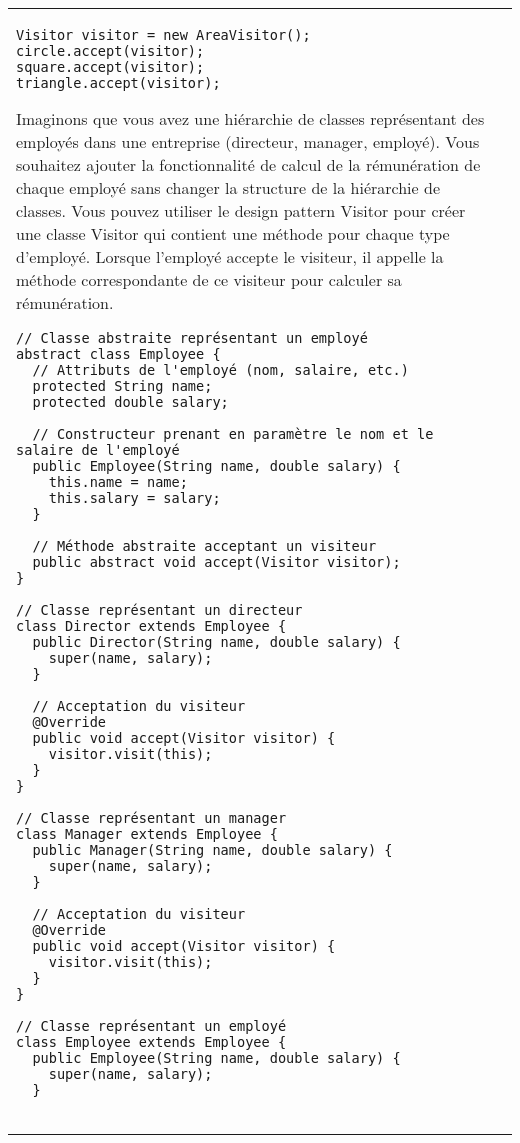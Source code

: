 \begin{minipage}[t]{1\textwidth}
\begin{table}[H]
\begin{adjustbox}{max width=\textwidth}
\begin{tabular}{l|p{\textwidth}}
\begin{minipage}[tl]{0.5\textwidth}
\begin{lstlisting}[style=monstyle]
Visitor visitor = new AreaVisitor();
circle.accept(visitor);
square.accept(visitor);
triangle.accept(visitor);
\end{lstlisting}
\end{minipage}
\hspace{6mm}
\begin{minipage}[tr]{0.5\textwidth}
Imaginons que vous avez une hiérarchie de classes représentant des employés dans une entreprise (directeur, manager, employé). Vous souhaitez ajouter la fonctionnalité de calcul de la rémunération de chaque employé sans changer la structure de la hiérarchie de classes. Vous pouvez utiliser le design pattern Visitor pour créer une classe Visitor qui contient une méthode pour chaque type d'employé. Lorsque l'employé accepte le visiteur, il appelle la méthode correspondante de ce visiteur pour calculer sa rémunération.  
\begin{lstlisting}[style=monstyle]
// Classe abstraite représentant un employé
abstract class Employee {
  // Attributs de l'employé (nom, salaire, etc.)
  protected String name;
  protected double salary;

  // Constructeur prenant en paramètre le nom et le salaire de l'employé
  public Employee(String name, double salary) {
    this.name = name;
    this.salary = salary;
  }

  // Méthode abstraite acceptant un visiteur
  public abstract void accept(Visitor visitor);
}

// Classe représentant un directeur
class Director extends Employee {
  public Director(String name, double salary) {
    super(name, salary);
  }

  // Acceptation du visiteur
  @Override
  public void accept(Visitor visitor) {
    visitor.visit(this);
  }
}

// Classe représentant un manager
class Manager extends Employee {
  public Manager(String name, double salary) {
    super(name, salary);
  }

  // Acceptation du visiteur
  @Override
  public void accept(Visitor visitor) {
    visitor.visit(this);
  }
}

// Classe représentant un employé
class Employee extends Employee {
  public Employee(String name, double salary) {
    super(name, salary);
  }


\end{lstlisting}
\end{minipage}
\end{tabular}
\end{adjustbox}
\end{table}
\end{minipage}
